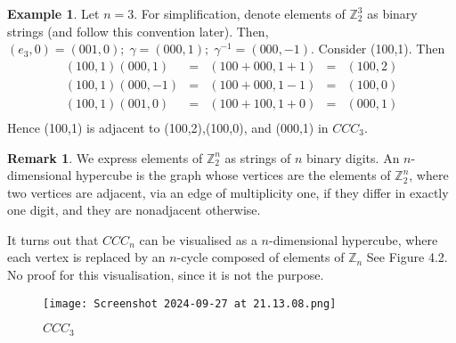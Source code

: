 \documentclass{book}
\newcommand{\Z}{\mathbb{Z}}
\theoremstyle{definition}
\theoremstyle{remarkstyle}
\newtheorem*{remark}{Remark}%
\newtheorem*{example}{Example}%
\begin{document}
\begin{example}
    Let $n=3$. For simplification, denote elements of $\Z^{3}_{2} $ as binary strings (and follow this convention later). Then, $(e_{3},0) = (001,0); \; \gamma = (000,1); \; \gamma^{-1} = (000,-1) $. \newline
    Consider (100,1). Then 
    $$
    \begin{array}{rcccl}
        (100,1)(000,1) &=& (100+000,1+1) &=& (100,2) \\
        (100,1)(000,-1) &=& (100+000,1-1) &=& (100,0) \\
        (100,1)(001,0) &=& (100+100,1+0) &=& (000,1) \\
    \end{array}
    $$
    Hence (100,1) is adjacent to (100,2),(100,0), and (000,1) in $CCC_{3} $.
\end{example}
\begin{remark}
    We express elements of $\Z^{n}_{2} $ as strings of $n$ binary digits. An $n$-dimensional hypercube is the graph whose vertices are the elements of $\Z_{2}^{n} $, where two vertices are adjacent, via an edge of multiplicity one, if they differ in exactly one digit, and they are nonadjacent otherwise. \newline
    
    It turns out that $CCC_{n} $ can be visualised as a $n$-dimensional hypercube, where each vertex is replaced by an $n$-cycle composed of elements of $\Z_{n}$ See Figure 4.2. No proof for this visualisation, since it is not the purpose.
\end{remark}

\begin{figure}[htbp!]
    \texttt{[image: Screenshot 2024-09-27 at 21.13.08.png]}
    \caption{$CCC_{3} $}
\end{figure}
\end{document}
